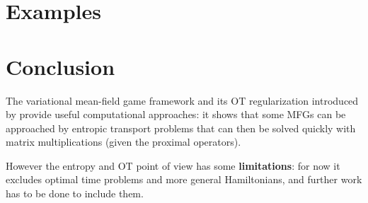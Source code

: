 \documentclass[11pt]{article}
\numberwithin{equation}{section}
\theoremstyle{definition}
\begin{document}




\section{Examples}\label{sec:Examples}




\section{Conclusion}

The variational mean-field game framework and its OT regularization introduced by \textcite{benamou:hal-01295299,benamou2018entropy} provide useful computational approaches: it shows that some MFGs can be approached by entropic transport problems that can then be solved quickly with matrix multiplications (given the proximal operators).

However the entropy and OT point of view has some \textbf{limitations}: for now it excludes optimal time problems and more general Hamiltonians, and further work has to be done to include them.




\printbibliography{}
\end{document}
